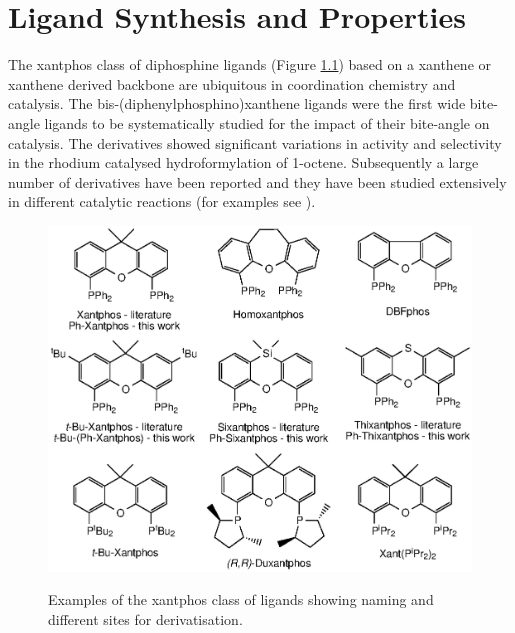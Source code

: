
\chapter{Ligand Synthesis and Properties}
\label{ch:ligands}

The xantphos class of diphosphine ligands (Figure \ref{Xantphosligands}) based on a xanthene or xanthene derived backbone are ubiquitous in coordination chemistry and catalysis.  The bis-(diphenylphosphino)xanthene ligands were the first wide bite-angle ligands to be systematically studied for the impact of their bite-angle on catalysis.\cite{Kranenburg1995}  The derivatives showed significant variations in activity and selectivity in the rhodium catalysed hydroformylation of 1-octene.  Subsequently a large number of derivatives have been reported and they have been studied extensively in different catalytic reactions (for examples see \cite{Kamer2001, Asensio2010, Dieleman2001, Jahromi2012, Birkholz2009, Veen2000b}).  

\begin{figure}[ht]
\begin{center}
\vspace{0.5cm}
\includegraphics{../Figures/Xantphosligands.eps}
\caption[Examples of the xantphos class of ligands]{Examples of the xantphos class of ligands showing naming and different sites for derivatisation.}
\vspace{0.2cm}
\label{Xantphosligands}
\end{center}
\end{figure}
\vspace{0.2cm}

